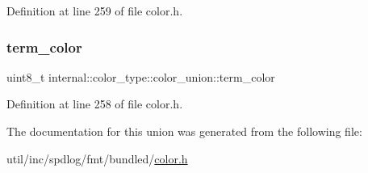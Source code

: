 Definition at line 259 of file color.\+h.

\mbox{\label{unioninternal_1_1color__type_1_1color__union_ac6843a3cb0050488db9fde54df345b82}} 
\subsubsection{\texorpdfstring{term\+\_\+color}{term\_color}}
{\footnotesize\ttfamily uint8\+\_\+t internal\+::color\+\_\+type\+::color\+\_\+union\+::term\+\_\+color}



Definition at line 258 of file color.\+h.



The documentation for this union was generated from the following file\+:\begin{DoxyCompactItemize}
\item 
util/inc/spdlog/fmt/bundled/\hyperlink{color_8h}{color.\+h}\end{DoxyCompactItemize}
